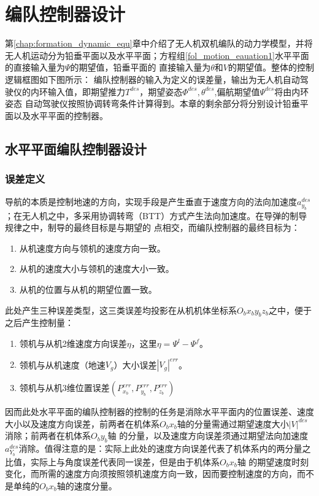 \chapter{编队控制器设计}
\label{chap:controller_design}
第\ref{chap:formation_dynamic_equ}章中介绍了无人机双机编队的动力学模型，并将无人机运动分为铅垂平面以及水平平面；方程组\ref{fol_motion_eauation1}水平平面的直接输入量为$\Psi$的期望值，铅垂平面的
直接输入量为$\theta$和$V$的期望值。整体的控制逻辑框图如下图所示：
编队控制器的输入为定义的误差量，输出为无人机自动驾驶仪的内环输入值，即期望推力$T^{des}$，期望姿态$\Phi^{des},\theta^{des}$,偏航期望值$\Psi^{des}$将由内环姿态
自动驾驶仪按照协调转弯条件计算得到。本章的剩余部分将分别设计铅垂平面以及水平平面的控制器。
\section{水平平面编队控制器设计}
\subsection{误差定义}
导航的本质是控制地速的方向，实现手段是产生垂直于速度方向的法向加速度$a_{y_b}^{des}$；在无人机之中，多采用协调转弯（BTT）方式产生法向加速度。在导弹的制导规律之中，制导的最终目标是与期望的
点相交，而编队控制器的最终目标为：
\begin{enumerate}
    \item 从机速度方向与领机的速度方向一致。
    \item 从机的速度大小与领机的速度大小一致。
    \item 从机的位置与从机的期望位置一致。
\end{enumerate}
此处产生三种误差类型，这三类误差均投影在从机机体坐标系$O_bx_by_bz_b$之中，便于之后产生控制量：
\begin{enumerate}
    \item 领机与从机2维速度方向误差$\eta$，这里$\eta=\Psi^l-\Psi^f$。%
    \item 领机与从机速度（地速$V_g$）大小误差$|V_g|^{err}$。
    \item 领机与从机3维位置误差$(P_{x_b}^{err},P_{y_b}^{err},P_{z_b}^{err})$
\end{enumerate}
因而此处水平平面的编队控制器的控制的任务是消除水平平面内的位置误差、速度大小以及速度方向误差，前两者在机体系$O_bx_b$轴的分量需通过期望速度大小${|V|}^{des}$消除；前两者在机体系$O_by_b$轴
的分量，以及速度方向误差须通过期望法向加速度$a_{Y_b}^{des}$消除。值得注意的是：实际上此处的速度方向误差代表了机体系内的两分量之比值，实际上与角度误差代表同一误差，但是由于机体系$O_bx_b$轴
的期望速度时刻变化，而所需的速度方向须按照领机速度方向一致，因而要控制速度的方向，而不是单纯的$O_bx_b$轴的速度分量。
